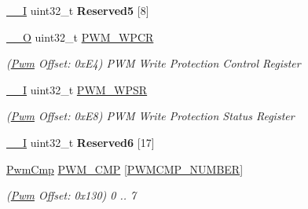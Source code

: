\begin{DoxyCompactItemize}
\mbox{\label{structPwm_ae2a601b4211659261603f0b3556d6e0e}} 
\mbox{\hyperlink{core__cm7_8h_af63697ed9952cc71e1225efe205f6cd3}{\+\_\+\+\_\+I}} uint32\+\_\+t {\bfseries Reserved5} \mbox{[}8\mbox{]}
\item 
\mbox{\label{structPwm_a442b89c8b56e3742c6a060979443c6c6}} 
\mbox{\hyperlink{core__cm7_8h_a7e25d9380f9ef903923964322e71f2f6}{\+\_\+\+\_\+O}} uint32\+\_\+t \mbox{\hyperlink{structPwm_a442b89c8b56e3742c6a060979443c6c6}{P\+W\+M\+\_\+\+W\+P\+CR}}
\begin{DoxyCompactList}\small\item\em (\mbox{\hyperlink{structPwm}{Pwm}} Offset\+: 0x\+E4) P\+WM Write Protection Control Register \end{DoxyCompactList}\item 
\mbox{\label{structPwm_ab7152d66306ca3dd7a8847787c220efa}} 
\mbox{\hyperlink{core__cm7_8h_af63697ed9952cc71e1225efe205f6cd3}{\+\_\+\+\_\+I}} uint32\+\_\+t \mbox{\hyperlink{structPwm_ab7152d66306ca3dd7a8847787c220efa}{P\+W\+M\+\_\+\+W\+P\+SR}}
\begin{DoxyCompactList}\small\item\em (\mbox{\hyperlink{structPwm}{Pwm}} Offset\+: 0x\+E8) P\+WM Write Protection Status Register \end{DoxyCompactList}\item 
\mbox{\label{structPwm_a5876905d1ee0bb06e373eeb3fb9bf34c}} 
\mbox{\hyperlink{core__cm7_8h_af63697ed9952cc71e1225efe205f6cd3}{\+\_\+\+\_\+I}} uint32\+\_\+t {\bfseries Reserved6} \mbox{[}17\mbox{]}
\item 
\mbox{\label{structPwm_a5570287157f5084b4d13cfaf3f26edaa}} 
\mbox{\hyperlink{structPwmCmp}{Pwm\+Cmp}} \mbox{\hyperlink{structPwm_a5570287157f5084b4d13cfaf3f26edaa}{P\+W\+M\+\_\+\+C\+MP}} \mbox{[}\mbox{\hyperlink{group__SAMV71__PWM_gace381626974919cd4b1106113a792dd5}{P\+W\+M\+C\+M\+P\+\_\+\+N\+U\+M\+B\+ER}}\mbox{]}
\begin{DoxyCompactList}\small\item\em (\mbox{\hyperlink{structPwm}{Pwm}} Offset\+: 0x130) 0 .. 7 \end{DoxyCompactList}\item 
\mbox{\label{structPwm_a39a7fd704476ca5019509faf487cb0d3}} 

\end{DoxyCompactItemize}
